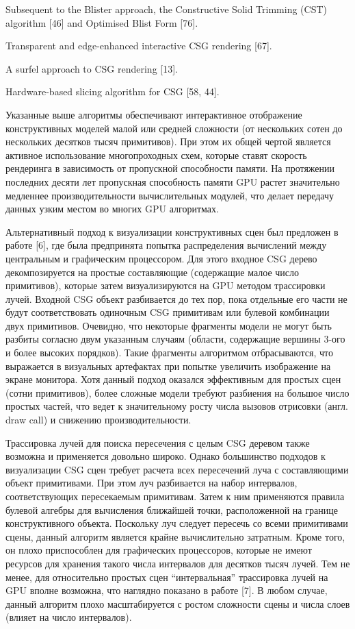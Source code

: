 Subsequent to the Blister approach, the Constructive Solid Trimming (CST) algorithm [46] and Optimised Blist Form [76].

Transparent and edge-enhanced interactive CSG rendering [67].

A surfel approach to CSG rendering [13].

Hardware-based slicing algorithm for CSG [58, 44].

Указанные выше алгоритмы обеспечивают интерактивное отображение конструктивных моделей малой или средней  сложности (от нескольких сотен до нескольких десятков тысяч примитивов). При этом их общей чертой является активное использование многопроходных схем, которые ставят скорость рендеринга в зависимость от пропускной способности памяти. На протяжении последних десяти лет пропускная способность памяти GPU растет значительно медленнее производительности вычислительных модулей,  что делает передачу данных узким местом во многих GPU алгоритмах.

Альтернативный подход к визуализации конструктивных сцен был предложен в работе [6], где была предпринята попытка распределения вычислений между центральным и графическим процессором. Для этого входное CSG дерево декомпозируется на простые составляющие (содержащие малое число примитивов), которые затем визуализируются на GPU методом трассировки лучей. Входной CSG объект разбивается до тех пор, пока отдельные его части не будут соответствовать одиночным CSG примитивам или булевой  комбинации двух примитивов. Очевидно, что некоторые фрагменты модели не могут быть разбиты согласно двум указанным случаям (области, содержащие вершины 3-ого и более высоких порядков). Такие фрагменты алгоритмом отбрасываются, что выражается в визуальных артефактах при попытке увеличить изображение на экране монитора. Хотя данный подход оказался эффективным для простых сцен (сотни примитивов), более сложные модели требуют разбиения на большое число простых частей, что ведет к значительному росту числа вызовов отрисовки (англ. draw call) и снижению производительности.

Трассировка лучей для поиска пересечения с целым CSG деревом также возможна и применяется довольно широко. Однако большинство подходов к визуализации CSG сцен требует расчета всех пересечений луча с составляющими объект примитивами. При этом луч разбивается на набор интервалов, соответствующих пересекаемым примитивам. Затем к ним применяются правила булевой алгебры для вычисления ближайшей точки, расположенной на границе конструктивного объекта. Поскольку луч следует пересечь со всеми примитивами сцены, данный алгоритм является крайне вычислительно затратным. Кроме того, он плохо приспособлен для графических процессоров, которые не имеют ресурсов для хранения такого числа интервалов для десятков тысяч лучей. Тем не менее, для относительно простых сцен “интервальная” трассировка лучей на GPU вполне возможна, что наглядно показано в работе [7]. В любом случае, данный алгоритм плохо масштабируется с ростом сложности сцены и числа слоев (влияет на число интервалов).

